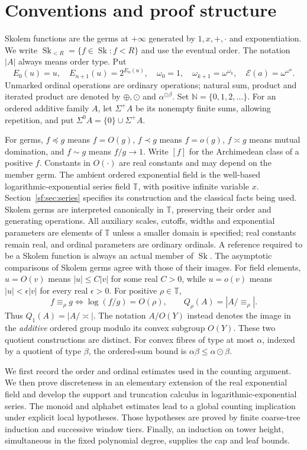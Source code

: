 \documentclass[11pt]{article}
\theoremstyle{definition}
\theoremstyle{remark}
\newcommand{\Sk}{\operatorname{Sk}}
\newcommand{\N}{\mathbb N}
\newcommand{\T}{\mathbb T}
\newcommand{\arch}{\mathrel{\asymp}}
\newcommand{\hs}{\mathbin{\oplus}}
\newcommand{\od}{\mathbin{\odot}}
\newcommand{\EE}{\mathcal E}
\numberwithin{equation}{section}
\begin{document}
\section{Conventions and proof structure}
Skolem functions are the germs at $+\infty$ generated by
$1,x,+,\cdot$ and exponentiation. We write
$\Sk_{<R}=\{f\in\Sk:f<R\}$ and use the eventual order.
The notation $|A|$ always means order type. Put
\[
 E_0(u)=u,\quad E_{n+1}(u)=2^{E_n(u)},\quad
 \omega_0=1,\quad\omega_{k+1}=\omega^{\omega_k},\quad
 \EE(a)=\omega^{\omega^a}.
\]
Unmarked ordinal operations are ordinary operations; natural sum,
product and iterated product are denoted by $\hs,\od$ and
$\alpha^{\od\beta}$. Set $\N=\{0,1,2,\ldots\}$.
For an ordered additive family $A$, let $\Sigma^+A$ be its
nonempty finite sums, allowing repetition, and put
$\Sigma^0A=\{0\}\cup\Sigma^+A$.

For germs, $f\preceq g$ means $f=O(g)$, $f\prec g$ means
$f=o(g)$, $f\arch g$ means mutual domination, and
$f\sim g$ means $f/g\to1$. Write $[f]$
for the Archimedean class of a positive $f$. Constants in
$O(\cdot)$ are real constants and may depend on the member germ.
The ambient ordered exponential field is the well-based
logarithmic-exponential series field $\T$, with positive infinite
variable $x$. Section~\ref{sf:sec:series} specifies its construction
and the classical facts being used. Skolem germs are interpreted
canonically in $\T$, preserving their order and generating operations.
All auxiliary scales, cutoffs, widths and exponential parameters are
elements of $\T$ unless a smaller domain is specified; real constants
remain real, and ordinal parameters are ordinary ordinals. A reference
required to be a Skolem function is always an actual member of $\Sk$.
The asymptotic comparisons of Skolem germs agree with those of their
images. For field elements, $u=O(v)$ means $|u|\le C|v|$ for some
real $C>0$, while $u=o(v)$ means $|u|<\epsilon|v|$ for every
real $\epsilon>0$. For positive $\rho\in\T$,
\[
 f\equiv_\rho g\iff\log(f/g)=O(\rho),\qquad
 Q_\rho(A)=|A/{\equiv_\rho}|.
\]
Thus $Q_1(A)=|A/\arch|$. The notation $A/O(Y)$ instead denotes
the image in the \emph{additive} ordered group modulo its convex
subgroup $O(Y)$. These two quotient constructions are distinct.
For convex fibres of type at most $\alpha$, indexed by a quotient
of type $\beta$, the ordered-sum bound is
$\alpha\beta\le\alpha\od\beta$.

We first record the order and ordinal estimates used in the counting
argument. We then prove discreteness in an elementary extension of the
real exponential field and develop the support and truncation calculus
in logarithmic-exponential series. The monoid and alphabet estimates
lead to a global counting implication under explicit local hypotheses.
Those hypotheses are proved by finite coarse-tree induction and
successive window tiers. Finally, an induction on tower height,
simultaneous in the fixed polynomial degree, supplies the cap and
leaf bounds.
\end{document}
